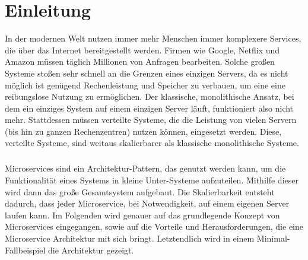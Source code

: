 \chapter{Einleitung}

In der modernen Welt nutzen immer mehr Menschen immer komplexere Services, die über das Internet bereitgestellt werden. Firmen wie Google, Netflix und Amazon müssen täglich Millionen von Anfragen bearbeiten. Solche großen Systeme stoßen sehr schnell an die Grenzen eines einzigen Servers, da es nicht möglich ist genügend Rechenleistung und Speicher zu verbauen, um eine eine reibungslose Nutzung zu ermöglichen. Der klassische, monolithische Ansatz, bei dem ein einziges System auf einem einzigen Server läuft, funktioniert also nicht mehr. Stattdessen müssen verteilte Systeme, die die Leistung von vielen Servern (bis hin zu ganzen Rechenzentren) nutzen können, eingesetzt werden. Diese, verteilte Systeme, sind weitaus skalierbarer als klassische monolithische Systeme.
\paragraph{}
Microservices sind ein Architektur-Pattern, das genutzt werden kann, um die Funktionalität eines Systems in kleine Unter-Systeme aufzuteilen. Mithilfe dieser wird dann das große Gesamtsystem aufgebaut. Die Skalierbarkeit entsteht dadurch, dass jeder Microservice, bei Notwendigkeit, auf einem eigenen Server laufen kann. Im Folgenden wird genauer auf das grundlegende Konzept von Microservices eingegangen, sowie auf die Vorteile und Herausforderungen, die eine Microservice Architektur mit sich bringt. Letztendlich wird in einem Minimal-Fallbeispiel die Architektur gezeigt.
